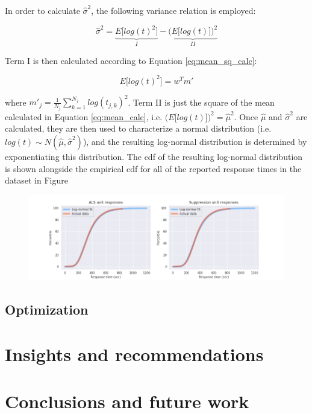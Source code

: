 \documentclass[article]{proc}
\begin{document}
In order to calculate $\hat\sigma^2$, the following variance relation is employed:


\begin{equation}
\hat\sigma^2 = \underbrace{E\big[log(t)^2\big]}_{I} - \underbrace{\bigg(E\big[log(t)\big]\bigg)^2}_{II}
\label{eq:var}
\end{equation}

Term I is then calculated according to Equation \ref{eq:mean_sq_calc}:

\begin{equation}
E\big[log(t)^2\big] = w^Tm'
\label{eq:mean_sq_calc}
\end{equation}

where 
$m'_j = \frac{1}{N_j}\sum_{k=1}^{N_j}log(t_{j,k})^2$. Term II is just the square of the mean calculated in Equation \ref{eq:mean_calc}, i.e. $\big(E\big[log(t)\big]\big)^2 = \hat\mu^2$. Once $\hat\mu$ and $\hat\sigma^2$ are calculated, they are then used to characterize a normal distribution (i.e. $ log(t) \sim N(\hat\mu, \hat\sigma^2)$), and the resulting log-normal distribution is determined by exponentiating this distribution. The cdf of the resulting log-normal distribution is shown alongside the empirical cdf for all of the reported response times in the dataset in Figure 


\begin{figure}[!htb]
  \centering
  \includegraphics[width=16cm,keepaspectratio]{Figures/lognorm.png}
  \caption{}
  \label{fig:alstree}
\end{figure}






\subsection{Optimization}



\section{Insights and recommendations}


\section{Conclusions and future work}





\scriptsize{

}
\end{document}
